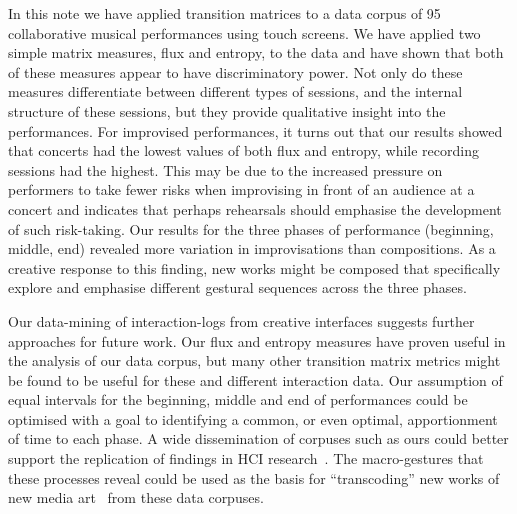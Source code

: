 \documentclass{sigchi}
\begin{document}
In this note we have applied transition matrices
to a data corpus of 95 collaborative musical performances using touch screens.
We have applied two simple matrix
measures, flux and entropy, to the data and have shown that
 both of these measures appear to 
have discriminatory power. Not only do these measures
differentiate between different types of sessions, and the internal
structure of these sessions, but they provide qualitative insight into the
performances. For improvised performances, it turns out that our results showed that concerts
had the lowest values of both flux and entropy, while recording sessions had
the highest. This may be due to the increased pressure on performers to take fewer risks
when improvising in front of an audience at a concert and indicates that perhaps rehearsals should 
emphasise the development of such risk-taking. 
Our results for the three phases of performance (beginning, middle, end)
revealed more variation in
improvisations than compositions. As a creative
 response to this finding, 
new works might be
composed that specifically explore and emphasise different gestural sequences across the three phases.

Our data-mining of interaction-logs from creative interfaces suggests
further approaches for future work.
Our flux and entropy measures have proven useful
in the analysis of our data corpus, but many other transition matrix
metrics might be found to be useful for these and different interaction data.
Our assumption of equal intervals for the beginning, middle and end of performances could be 
optimised with a goal to identifying a common, or even optimal, apportionment of time to each phase.  
A wide dissemination of corpuses such as ours could better support the replication of findings in HCI
research~\cite{Wilson:2011ve}. The macro-gestures that these
processes reveal could be used as the basis for ``transcoding'' new works of new media
art~\cite{Manovich:2002ly} from these data corpuses. 





\end{document}
